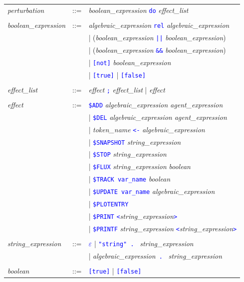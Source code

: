 \documentclass[11pt]{book}
\def\tcb#1{\textcolor{blue}{\ttt{#1}}}
\def\ttt#1{\texttt{#1}}
\def\var#1{{\textquotesingle}#1{\textquotesingle}}
\begin{document}
\begin{table}[htbp]
\begin{tabular}{@{} lcl @{}}
    \textit{perturbation} &::=& \textit{boolean\_expression} \tcb{\ttt{do}} \textit{effect\_list} \\\\
    \textit{boolean\_expression} &::=& \textit{algebraic\_expression}\index{boolean expression} \tcb{rel} \textit{algebraic\_expression} \\
    && | (\textit{boolean\_expression} \tcb{||} \textit{boolean\_expression}) \\
    && | (\textit{boolean\_expression} \tcb{\&\&} \textit{boolean\_expression}) \\
    && | \tcb{[not]} \textit{boolean\_expression} \\
    && | \tcb{[true]} | \tcb{[false]} \\\\
    \textit{effect\_list} &::=& \textit{effect} \tcb{\ttt {;}} \textit{effect\_list} | \textit{effect} \\\\
\textit{effect} &::=& \tcb{\$ADD} \textit{algebraic\_expression agent\_expression} \\
    && | \tcb{\$DEL} \textit{algebraic\_expression agent\_expression} \\
    && | \textit{token\_name} \tcb{<-} \textit{algebraic\_expression} \\
    && | \tcb{\$SNAPSHOT} \textit{string\_expression}\\
    && | \tcb{\$STOP} \textit{string\_expression}\\
	&& | \tcb{\$FLUX} \textit{string\_expression} \textit{boolean} \\
    && | \tcb{\$TRACK \var{var\_name}} \textit{boolean} \\
    && | \tcb{\$UPDATE \var{var\_name}} \textit{algebraic\_expression} \\
    && | \tcb{\$PLOTENTRY} \\
    && | \tcb{\$PRINT} \tcb{<}\textit{string\_expression}\tcb{>} \\
    && | \tcb{\$PRINTF} \textit{string\_expression} \tcb{<}\textit{string\_expression}\tcb{>} \\
    \\
    \textit{string\_expression} &::=& \tcb{$\varepsilon$} | \tcb{"string" . } \textit{string\_expression} \\
    && | \textit{algebraic\_expression}\tcb{ . } \textit{string\_expression} \\\\
	\textit{boolean} &::=& \tcb{[true]} | \tcb{[false]}
  \end{tabular}
  \label{tab:pert}
\end{table}
\end{document}
